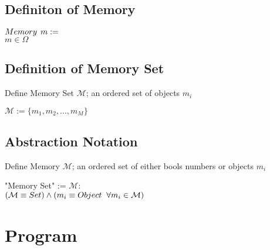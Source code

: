 \documentclass[11pt]{article}
\begin{document}
\subsection{Definiton of Memory}
\begin{center}
$
Memory \hspace{1.5mm} m :=
$
\\ \vspace{2mm}
$
m \in \Omega
$
\end{center}







\subsection{Definition of Memory Set}
Define Memory Set $\mathcal{M}$; an ordered set of objects $m_i$
\begin{center}
$\mathcal{M} := \{m_1,m_2,...,m_M\}$
\end{center}




\subsection{Abstraction Notation}
Define Memory $\mathcal{M}$; an ordered set of either bools numbers or objects $m_i$
\begin{center}
"Memory Set" := $\mathcal{M}:$
\\ \vspace{2mm}
$
(\mathcal{M} \equiv Set) \land (m_i \equiv Object \hspace{2mm} \forall m_i \in \mathcal{M}) 
$
\end{center}










\newpage

\section{Program}
\end{document}
